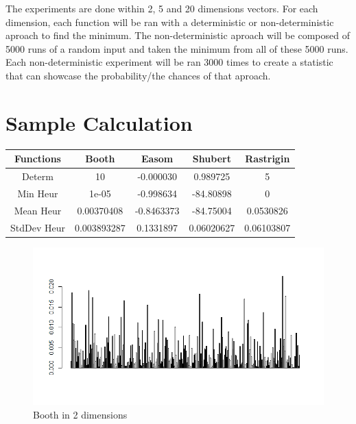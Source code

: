 \documentclass{article}
\begin{document}
	The experiments are done within 2, 5 and 20 dimensions vectors. 
For each dimension, each function will be ran with a deterministic or non-deterministic aproach to find the minimum.
The non-deterministic aproach will be composed of 5000 runs of a random input and taken the minimum from all of these 5000 runs.
Each non-deterministic experiment will be ran 3000 times to create a statistic that can showcase the probability/the chances of that aproach.



\section{Sample Calculation}

\begin{center}
 \begin{tabular}{||c || c | c | c | c ||} 
 \hline
 Functions & Booth & Easom & Shubert & Rastrigin \\
 \hline
 Determ & 10  & -0.000030 & 0.989725  & 5 \\ 
 \hline
 Min Heur & 1e-05 & -0.998634 & -84.80898 & 0 \\
 \hline
 Mean Heur & 0.00370408 & -0.8463373 & -84.75004 & 0.0530826 \\
 \hline
 StdDev Heur & 0.003893287 & 0.1331897 & 0.06020627 & 0.06103807 \\
 \hline
\end{tabular}
\end{center}



\begin{figure}[h!]
    \centering
    \includegraphics[width=1\textwidth]{./results/booth2}
    \caption{Booth in 2 dimensions}
    \label{fig:Booth in 2 dimensions}
\end{figure}
\end{document}
